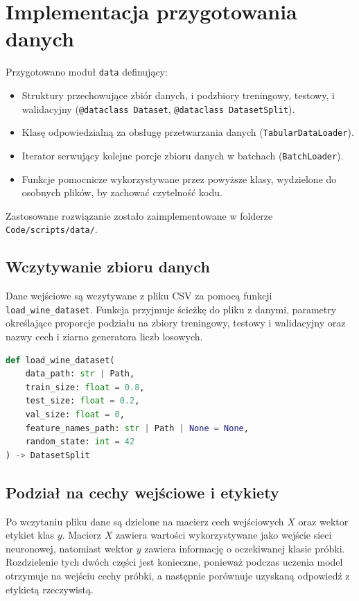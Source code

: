 \section{Implementacja przygotowania danych}

Przygotowano moduł \texttt{data} definujący:
\begin{itemize}
 \item Struktury przechowujące zbiór danych, i podzbiory treningowy, testowy, i walidacyjny (\texttt{@dataclass Dataset}, \texttt{@dataclass DatasetSplit}).
 \item Klasę odpowiedzialną za obsługę przetwarzania danych (\texttt{TabularDataLoader}).
 \item Iterator serwujący kolejne porcje zbioru danych w batchach (\texttt{BatchLoader}).
 \item Funkcje pomocnicze wykorzystywane przez powyższe klasy, wydzielone do osobnych plików, by zachować czytelność kodu.
\end{itemize}

Zastosowane rozwiązanie zostało zaimplementowane w folderze \texttt{Code/scripts/data/}. 

\subsection{Wczytywanie zbioru danych}

Dane wejściowe są wczytywane z pliku CSV za pomocą funkcji \texttt{load\_wine\_dataset}. Funkcja przyjmuje ścieżkę do pliku z danymi, parametry określające proporcje podziału na zbiory treningowy, testowy i walidacyjny oraz nazwy cech i ziarno generatora liczb losowych.

\begin{lstlisting}[language=Python, caption={Fragment funkcji wczytującej dane ze zbioru Wine.}, label={lst:load_wine_dataset_basic}, basicstyle=\ttfamily\small, breaklines=true, frame=single]
def load_wine_dataset(
    data_path: str | Path,
    train_size: float = 0.8,
    test_size: float = 0.2,
    val_size: float = 0,
    feature_names_path: str | Path | None = None,
    random_state: int = 42
) -> DatasetSplit
\end{lstlisting}

\subsection{Podział na cechy wejściowe i etykiety}

Po wczytaniu pliku dane są dzielone na macierz cech wejściowych $X$ oraz wektor etykiet klas $y$. Macierz $X$ zawiera wartości wykorzystywane jako wejście sieci neuronowej, natomiast wektor $y$ zawiera informację o oczekiwanej klasie próbki. Rozdzielenie tych dwóch części jest konieczne, ponieważ podczas uczenia model otrzymuje na wejściu cechy próbki, a następnie porównuje uzyskaną odpowiedź z etykietą rzeczywistą.

